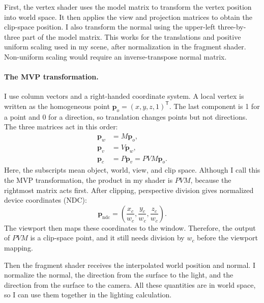 \documentclass[acmtog]{acmart}
\begin{document}
First, the vertex shader uses the model matrix to transform the vertex position into world space. It then applies the view and projection matrices to obtain the clip-space position. I also transform the normal using the upper-left three-by-three part of the model matrix. This works for the translations and positive uniform scaling used in my scene, after normalization in the fragment shader. Non-uniform scaling would require an inverse-transpose normal matrix.

\paragraph{The MVP transformation.}
I use column vectors and a right-handed coordinate system. A local vertex is written as the homogeneous point $\mathbf p_o=(x,y,z,1)^{\mathsf T}$. The last component is 1 for a point and 0 for a direction, so translation changes points but not directions. The three matrices act in this order:
\begin{equation}
\begin{aligned}
\mathbf p_w&=M\mathbf p_o,\\
\mathbf p_v&=V\mathbf p_w,\\
\mathbf p_c&=P\mathbf p_v=PVM\mathbf p_o.
\end{aligned}
\end{equation}
Here, the subscripts mean object, world, view, and clip space. Although I call this the MVP transformation, the product in my shader is $PVM$, because the rightmost matrix acts first. After clipping, perspective division gives normalized device coordinates (NDC):
\begin{equation}
\mathbf p_{\mathrm{ndc}}=
\left(\frac{x_c}{w_c},\frac{y_c}{w_c},\frac{z_c}{w_c}\right).
\end{equation}
The viewport then maps these coordinates to the window. Therefore, the output of $PVM$ is a clip-space point, and it still needs division by $w_c$ before the viewport mapping.

Then the fragment shader receives the interpolated world position and normal. I normalize the normal, the direction from the surface to the light, and the direction from the surface to the camera. All these quantities are in world space, so I can use them together in the lighting calculation.
\end{document}
